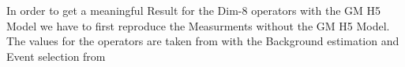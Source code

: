 \documentclass[../Bachelorarbeit.tex]{subfiles}
\begin{document}
\label{sec:Event_selection}
In order to get a meaningful Result for the Dim-8 operators with the GM H5 Model we have to first reproduce the Measurments
without the GM H5 Model. The values for the operators are taken from \cite{NEeeeeeed Source} with the Background estimation
and Event selection from \cite{Collaboration.2018}
\end{document}
